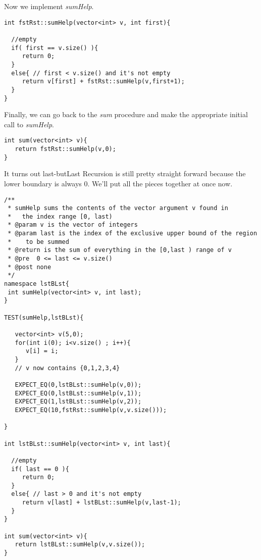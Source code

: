 \documentclass[]{tufte-handout}
\begin{document}
Now we implement \textit{sumHelp}.
\begin{verbatim}
int fstRst::sumHelp(vector<int> v, int first){
 
  //empty
  if( first == v.size() ){
     return 0;
  }
  else{ // first < v.size() and it's not empty
     return v[first] + fstRst::sumHelp(v,first+1);
  }    
}
\end{verbatim}

Finally, we can go back to the \textit{sum} procedure and make the appropriate initial call to \textit{sumHelp}.
\begin{verbatim}
int sum(vector<int> v){
   return fstRst::sumHelp(v,0);
}
\end{verbatim}

It turns out last-butLast Recursion is still pretty straight forward because the lower boundary is always $0$. We'll put all the pieces together at once now.
\begin{verbatim}
/**
 * sumHelp sums the contents of the vector argument v found in
 *   the index range [0, last)
 * @param v is the vector of integers
 * @param last is the index of the exclusive upper bound of the region 
 *    to be summed
 * @return is the sum of everything in the [0,last ) range of v
 * @pre  0 <= last <= v.size()
 * @post none
 */
namespace lstBLst{
 int sumHelp(vector<int> v, int last);
} 

TEST(sumHelp,lstBLst){

   vector<int> v(5,0);
   for(int i(0); i<v.size() ; i++){
      v[i] = i;		   
   }
   // v now contains {0,1,2,3,4}
   
   EXPECT_EQ(0,lstBLst::sumHelp(v,0));
   EXPECT_EQ(0,lstBLst::sumHelp(v,1));
   EXPECT_EQ(1,lstBLst::sumHelp(v,2));
   EXPECT_EQ(10,fstRst::sumHelp(v,v.size()));
   
}

int lstBLst::sumHelp(vector<int> v, int last){
 
  //empty
  if( last == 0 ){
     return 0;
  }
  else{ // last > 0 and it's not empty
     return v[last] + lstBLst::sumHelp(v,last-1);
  }    
}

int sum(vector<int> v){
   return lstBLst::sumHelp(v,v.size());
}
\end{verbatim}
\end{document}
